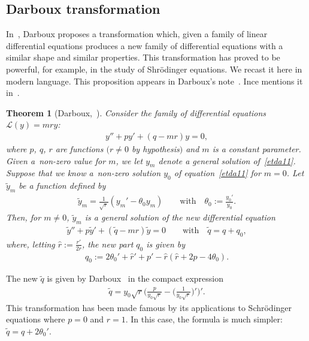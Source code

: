 \documentclass[10pt,a4paper]{amsart}
\numberwithin{equation}{section}
\newtheorem{Theorem}{Theorem}[section]
\begin{document}
\subsection{Darboux transformation}
In~\cite{da1}, Darboux proposes a transformation which, given a family of linear differential equations produces a new family of differential equations with a similar shape and similar properties. This transformation has proved to be powerful, for example, in the study of Shr\"odinger equations.
We recast it here in modern language.
This proposition appears in Darboux's note~\cite{da1}.
Ince mentions it in~\cite[p.~132]{in}.

\begin{Theorem}[Darboux,~\cite{da1}]\label{tda1}
Consider the family of differential equations $\mathcal{L}(y)=m r y$:
\begin{gather}\label{etda11}
y''+ py'+(q -mr)y = 0,
\end{gather}
where $p$, $q$, $r$ are functions $(r\neq 0$ by hypothesis$)$ and $m$ is a constant parameter.
Given a~non-zero value for $m$, we let $y_m$ denote a general solution of~\eqref{etda11}.
Suppose that we know a~non-zero solution $y_0$ of equation~\eqref{etda11} for $m=0$.
Let $\tilde{y}_m$ be a function defined by 	
\begin{gather}\label{etda12}
\tilde{y}_m
 = \frac{1}{\sqrt{r}} (y_m'- \theta_0 y_m) \qquad \textrm{with} \quad
 \theta_0:= \frac{y_0'}{y_0}.
 \end{gather}
Then, for $m\neq 0$, $\tilde{y}_m$ is a general solution of the new differential equation
\begin{gather}\label{etda13}
\tilde{y}''+p\tilde{y}'+(\tilde{q}-mr)\tilde{y}=0 \qquad \textrm{with} \quad
\tilde{q} = q + q_0,
\end{gather}
where, letting $\hat{r}:=\frac{r'}{2r}$, the new part $q_0$ is given by
\begin{gather*}%
q_0:= 2 \theta_{{0}}' + \hat{r}' + p'- \hat{r}(\hat{r} + 2 p -4\theta_0).
\end{gather*}
\end{Theorem}

The new $\tilde{q}$ is given by Darboux~\cite{da1} in the compact expression
\begin{gather*}
\tilde{q}=y_0 \sqrt{r}\bigg(\frac{p}{y_0 \sqrt{r}} -\bigg(\frac{1}{y_0 \sqrt{r}}\bigg)'\bigg)'.
\end{gather*}
This transformation has been made famous by its applications to Schr\"odinger equations where $p=0$ and $r=1$. In this case, the formula is much simpler: $\tilde{q}=q+ 2\theta_0'$.
\end{document}

